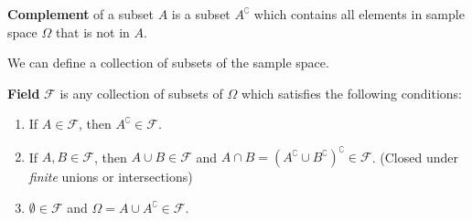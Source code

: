 \documentclass{huhtakm-template-book}
\begin{document}
    \begin{defn} %
        \textbf{Complement} of a subset $A$ is a subset $A^{\complement}$ which contains all elements in sample space $\Omega$ that is not in $A$.
    \end{defn}
    We can define a collection of subsets of the sample space.
    \begin{defn} %
        \textbf{Field} $\mathcal{F}$ is any collection of subsets of $\Omega$ which satisfies the following conditions:
        \begin{enumerate}
            \item If $A\in\mathcal{F}$, then $A^{\complement}\in\mathcal{F}$.
            \item If $A,B\in\mathcal{F}$, then $A\cup B\in\mathcal{F}$ and $A\cap B=(A^{\complement}\cup B^{\complement})^{\complement}\in\mathcal{F}$. (Closed under \textit{finite} unions or intersections)
            \item $\emptyset\in\mathcal{F}$ and $\Omega=A\cup A^{\complement}\in\mathcal{F}$.
        \end{enumerate}
    \end{defn}
\end{document}
